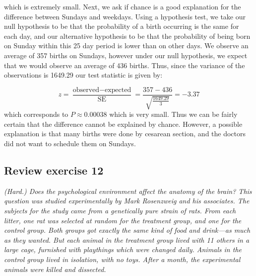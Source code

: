 \documentclass[11pt]{article}
\begin{document}
\noindent which is extremely small. Next, we ask if chance is a good explanation for the difference between Sundays and weekdays. Using a hypothesis test, we take our null hypothesis to be that the probability of a birth occurring is the same for each day, and our alternative hypothesis to be that the probability of being born on Sunday within this 25 day period is lower than on other days. We observe an average of 357 births on Sundays, however under our null hypothesis, we expect that we would observe an average of 436 births. Thus, since the variance of the observations is 1649.29 our test statistic is given by:

$$z = \frac{\text{observed} - \text{expected}}{\text{SE}} = \frac{357 - 436}{\sqrt{\frac{1649.29}{3}}} = -3.37 $$
\noindent which corresponds to $P \approx 0.00038$ which is very small. Thus we can be fairly certain that the difference cannot be explained by chance. However, a possible explanation is that many births were done by cesarean section, and the doctors did not want to schedule them on Sundays.



\subsection*{Review exercise 12} %
\noindent \emph{(Hard.) Does the psychological environment affect the anatomy of the brain? This question was studied experimentally by Mark Rosenzweig and his associates. The subjects for the study came from a genetically pure strain of rats. From each litter, one rat was selected at random for the treatment group, and one for the control group. Both groups got exactly the same kind of food and drink---as much as they wanted. But each animal in the treatment group lived with 11 others in a large cage, furnished with playthings which were changed daily. Animals in the control group lived in isolation, with no toys. After a month, the experimental animals were killed and dissected.}\\
\end{document}
